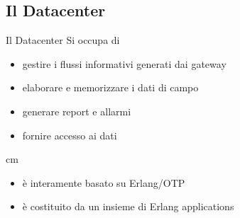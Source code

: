 \documentclass{beamer}
\newcommand{\N}{\vskip 0.3 cm}
\newcommand{\red}[1]{\textcolor[rgb]{.8,0,0}{#1}}
\newcommand{\green}[1]{\textcolor[rgb]{0,.6,.1}{#1}}
\begin{document}
%

%
\subsection{Il Datacenter}
%
\begin{frame}{Il Datacenter}
Si occupa di
\begin{itemize}
\item \green{gestire i flussi informativi} generati dai gateway
\item \green{elaborare} e \green{memorizzare} i dati di campo 
\item generare \green{report} e \green{allarmi}
\item fornire \green{accesso ai dati}
\end{itemize}
%
\N
\begin{itemize}
  \item \`e interamente basato su \red{Erlang/OTP}
  \item \`e costituito da un insieme di \red{Erlang applications}
\end{itemize}
%
\begin{figure}[!h]
  \begin{center}
  \end{center}
\end{figure}
%
\end{frame}
%
\end{document}
